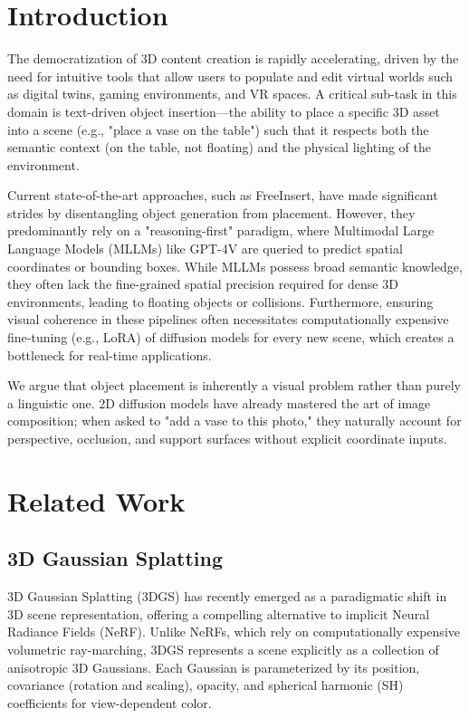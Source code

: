 \documentclass[pdflatex,sn-mathphys-num]{sn-jnl}%
\theoremstyle{thmstyleone}%
\theoremstyle{thmstyletwo}%
\theoremstyle{thmstylethree}%
\begin{document}
\section{Introduction}\label{sec1}

The democratization of 3D content creation is rapidly accelerating, driven by the need for intuitive tools that allow users to populate and edit virtual worlds such as digital twins, gaming environments, and VR spaces. A critical sub-task in this domain is text-driven object insertion—the ability to place a specific 3D asset into a scene (e.g., "place a vase on the table") such that it respects both the semantic context (on the table, not floating) and the physical lighting of the environment.

Current state-of-the-art approaches, such as FreeInsert, have made significant strides by disentangling object generation from placement. However, they predominantly rely on a "reasoning-first" paradigm, where Multimodal Large Language Models (MLLMs) like GPT-4V are queried to predict spatial coordinates or bounding boxes. While MLLMs possess broad semantic knowledge, they often lack the fine-grained spatial precision required for dense 3D environments, leading to floating objects or collisions. Furthermore, ensuring visual coherence in these pipelines often necessitates computationally expensive fine-tuning (e.g., LoRA) of diffusion models for every new scene, which creates a bottleneck for real-time applications.

We argue that object placement is inherently a visual problem rather than purely a linguistic one. 2D diffusion models have already mastered the art of image composition; when asked to "add a vase to this photo," they naturally account for perspective, occlusion, and support surfaces without explicit coordinate inputs.


\section{Related Work}\label{sec2}

\subsection{3D Gaussian Splatting}

3D Gaussian Splatting (3DGS) has recently emerged as a paradigmatic shift in 3D scene representation, offering a compelling alternative to implicit Neural Radiance Fields (NeRF). Unlike NeRFs, which rely on computationally expensive volumetric ray-marching, 3DGS represents a scene explicitly as a collection of anisotropic 3D Gaussians. Each Gaussian is parameterized by its position, covariance (rotation and scaling), opacity, and spherical harmonic (SH) coefficients for view-dependent color.
\end{document}
